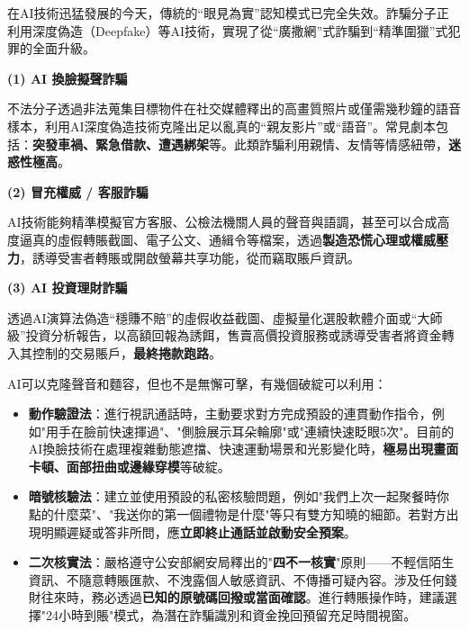 
在AI技術迅猛發展的今天，傳統的“眼見為實”認知模式已完全失效。詐騙分子正利用深度偽造（Deepfake）等AI技術，實現了從“廣撒網”式詐騙到“精準圍獵”式犯罪的全面升級。


\textbf{(1) AI 換臉擬聲詐騙}\par

不法分子透過非法蒐集目標物件在社交媒體釋出的高畫質照片或僅需幾秒鐘的語音樣本，利用AI深度偽造技術克隆出足以亂真的“親友影片”或“語音”。常見劇本包括：\textbf{突發車禍、緊急借款、遭遇綁架}等。此類詐騙利用親情、友情等情感紐帶，\textbf{迷惑性極高}。

\textbf{(2) 冒充權威 / 客服詐騙}\par

AI技術能夠精準模擬官方客服、公檢法機關人員的聲音與語調，甚至可以合成高度逼真的虛假轉賬截圖、電子公文、通緝令等檔案，透過\textbf{製造恐慌心理或權威壓力}，誘導受害者轉賬或開啟螢幕共享功能，從而竊取賬戶資訊。

\textbf{(3) AI 投資理財詐騙}\par

透過AI演算法偽造“穩賺不賠”的虛假收益截圖、虛擬量化選股軟體介面或“大師級”投資分析報告，以高額回報為誘餌，售賣高價投資服務或誘導受害者將資金轉入其控制的交易賬戶，\textbf{最終捲款跑路}。


AI可以克隆聲音和麵容，但也不是無懈可擊，有幾個破綻可以利用：

\begin{itemize}
  \item \textbf{動作驗證法}：進行視訊通話時，主動要求對方完成預設的連貫動作指令，例如"用手在臉前快速揮過"、"側臉展示耳朵輪廓"或"連續快速眨眼5次"。目前的AI換臉技術在處理複雜動態遮擋、快速運動場景和光影變化時，\textbf{極易出現畫面卡頓、面部扭曲或邊緣穿模}等破綻。
  \item \textbf{暗號核驗法}：建立並使用預設的私密核驗問題，例如"我們上次一起聚餐時你點的什麼菜"、"我送你的第一個禮物是什麼"等只有雙方知曉的細節。若對方出現明顯遲疑或答非所問，應\textbf{立即終止通話並啟動安全預案}。
  \item \textbf{二次核實法}：嚴格遵守公安部網安局釋出的"\textbf{四不一核實}"原則——不輕信陌生資訊、不隨意轉賬匯款、不洩露個人敏感資訊、不傳播可疑內容。涉及任何錢財往來時，務必透過\textbf{已知的原號碼回撥或當面確認}。進行轉賬操作時，建議選擇"24小時到賬"模式，為潛在詐騙識別和資金挽回預留充足時間視窗。
\end{itemize}

